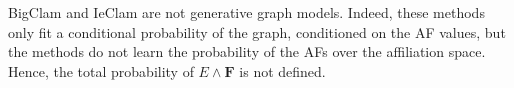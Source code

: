 \documentclass{article}
\theoremstyle{plain}
\theoremstyle{definition}
\theoremstyle{remark}
\begin{document}
BigClam and IeClam are not  generative graph models. Indeed, these methods only fit a conditional probability of the graph, conditioned on the AF values, but the methods do not learn the probability of the AFs over the affiliation space. Hence, the total probability of $E\wedge\mathbf{F}$ is not defined. %
%
\end{document}
